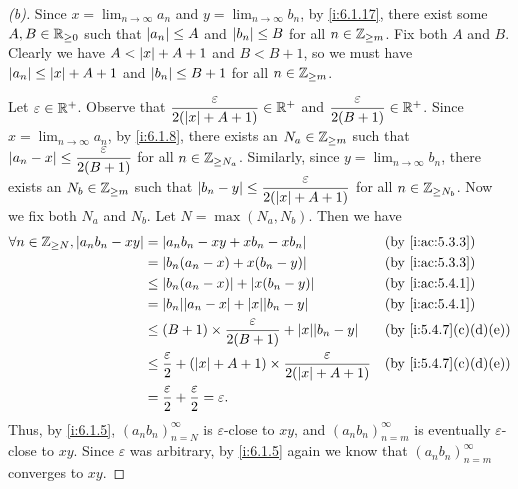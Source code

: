 \begin{proof}[(b)]
  Since \(x = \lim_{n \to \infty} a_n\) and \(y = \lim_{n \to \infty} b_n\), by \cref{i:6.1.17}, there exist some \(A, B \in \mathbb{R}_{\geq 0}\) such that \(\left\lvert a_n\right\rvert \leq A\) and \(\left\lvert b_n\right\rvert \leq B\) for all \(n \in \mathbb{Z}_{\geq m}\).
  Fix both \(A\) and \(B\).
  Clearly we have \(A < \left\lvert x\right\rvert + A + 1\) and \(B < B + 1\), so we must have \(\left\lvert a_n\right\rvert \leq \left\lvert x\right\rvert + A + 1\) and \(\left\lvert b_n\right\rvert \leq B + 1\) for all \(n \in \mathbb{Z}_{\geq m}\).

  Let \(\varepsilon \in \mathbb{R}^+\).
  Observe that \(\dfrac{\varepsilon}{2 (\left\lvert x\right\rvert + A + 1)} \in \mathbb{R}^+\) and \(\dfrac{\varepsilon}{2 (B + 1)} \in \mathbb{R}^+\).
  Since \(x = \lim_{n \to \infty} a_n\), by \cref{i:6.1.8}, there exists an \(N_a \in \mathbb{Z}_{\geq m}\) such that \(\left\lvert a_n - x\right\rvert \leq \dfrac{\varepsilon}{2(B + 1)}\) for all \(n \in \mathbb{Z}_{\geq N_a}\).
  Similarly, since \(y = \lim_{n \to \infty} b_n\), there exists an \(N_b \in \mathbb{Z}_{\geq m}\) such that \(\left\lvert b_n - y\right\rvert \leq \dfrac{\varepsilon}{2 (\left\lvert x\right\rvert + A + 1)}\) for all \(n \in \mathbb{Z}_{\geq N_b}\).
  Now we fix both \(N_a\) and \(N_b\).
  Let \(N = \max(N_a, N_b)\).
  Then we have
  \begin{align*}
    \forall n \in \Z_{\geq N}, \abs{a_n b_n - x y} & = \abs{a_n b_n - x y + x b_n - x b_n}                                                           &  & \by{i:ac:5.3.3}     \\
                                                   & = \abs{b_n(a_n - x) + x(b_n - y)}                                                               &  & \by{i:ac:5.3.3}     \\
                                                   & \leq \abs{b_n(a_n - x)} + \abs{x(b_n - y)}                                                      &  & \by{i:ac:5.4.1}     \\
                                                   & = \abs{b_n}\abs{a_n - x} + \abs{x}\abs{b_n - y}                                                 &  & \by{i:ac:5.4.1}     \\
                                                   & \leq (B + 1) \times \dfrac{\varepsilon}{2 (B + 1)} + \abs{x}\abs{b_n - y}                       &  & \by{i:5.4.7}[c,d,e] \\
                                                   & \leq \dfrac{\varepsilon}{2} + (\abs{x} + A + 1) \times \dfrac{\varepsilon}{2 (\abs{x} + A + 1)} &  & \by{i:5.4.7}[c,d,e] \\
                                                   & = \dfrac{\varepsilon}{2} + \dfrac{\varepsilon}{2} = \varepsilon.
  \end{align*}
  Thus, by \cref{i:6.1.5}, \((a_n b_n)_{n = N}^\infty\) is \(\varepsilon\)-close to \(xy\), and \((a_n b_n)_{n = m}^\infty\) is eventually \(\varepsilon\)-close to \(xy\).
  Since \(\varepsilon\) was arbitrary, by \cref{i:6.1.5} again we know that \((a_n b_n)_{n = m}^\infty\) converges to \(xy\).
\end{proof}

